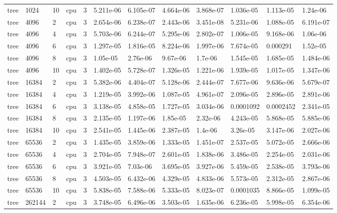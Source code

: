 \begin{tabular}{llllllllllll}
tree & 1024 & 10 & cpu & 3 & 5.211e-06 & 6.105e-07 & 4.664e-06 & 3.868e-07 & 1.036e-05 & 1.113e-05 & 1.24e-06 \\
tree & 4096 & 2 & cpu & 3 & 2.654e-06 & 6.238e-07 & 2.443e-06 & 3.451e-08 & 5.231e-06 & 1.088e-05 & 6.191e-07 \\
tree & 4096 & 4 & cpu & 3 & 5.703e-06 & 6.244e-07 & 5.295e-06 & 2.802e-07 & 1.006e-05 & 9.168e-06 & 1.06e-06 \\
tree & 4096 & 6 & cpu & 3 & 1.297e-05 & 1.816e-05 & 8.224e-06 & 1.997e-06 & 7.674e-05 & 0.000291 & 1.52e-05 \\
tree & 4096 & 8 & cpu & 3 & 1.05e-05 & 2.76e-06 & 9.67e-06 & 1.7e-06 & 1.545e-05 & 1.685e-05 & 1.484e-06 \\
tree & 4096 & 10 & cpu & 3 & 1.402e-05 & 5.728e-07 & 1.326e-05 & 1.221e-06 & 1.939e-05 & 1.017e-05 & 1.347e-06 \\
tree & 16384 & 2 & cpu & 3 & 5.382e-06 & 4.404e-07 & 5.128e-06 & 2.444e-07 & 7.677e-06 & 9.636e-06 & 5.679e-07 \\
tree & 16384 & 4 & cpu & 3 & 1.219e-05 & 3.992e-06 & 1.087e-05 & 4.961e-07 & 2.096e-05 & 2.896e-05 & 2.891e-06 \\
tree & 16384 & 6 & cpu & 3 & 3.138e-05 & 4.858e-05 & 1.727e-05 & 3.034e-06 & 0.0001092 & 0.0002452 & 2.341e-05 \\
tree & 16384 & 8 & cpu & 3 & 2.135e-05 & 1.197e-06 & 1.85e-05 & 2.32e-06 & 4.243e-05 & 5.868e-05 & 5.885e-06 \\
tree & 16384 & 10 & cpu & 3 & 2.541e-05 & 1.445e-06 & 2.387e-05 & 1.4e-06 & 3.26e-05 & 3.147e-06 & 2.027e-06 \\
tree & 65536 & 2 & cpu & 3 & 1.435e-05 & 3.859e-06 & 1.333e-05 & 1.451e-07 & 2.537e-05 & 5.072e-05 & 2.666e-06 \\
tree & 65536 & 4 & cpu & 3 & 2.704e-05 & 7.948e-07 & 2.601e-05 & 1.838e-06 & 3.486e-05 & 2.254e-05 & 2.031e-06 \\
tree & 65536 & 6 & cpu & 3 & 3.921e-05 & 7.03e-06 & 3.695e-05 & 3.927e-06 & 5.459e-05 & 2.538e-05 & 3.793e-06 \\
tree & 65536 & 8 & cpu & 3 & 4.503e-05 & 6.432e-06 & 4.329e-05 & 4.833e-06 & 5.573e-05 & 2.312e-05 & 2.867e-06 \\
tree & 65536 & 10 & cpu & 3 & 5.838e-05 & 7.588e-06 & 5.333e-05 & 8.023e-07 & 0.0001035 & 8.866e-05 & 1.099e-05 \\
tree & 262144 & 2 & cpu & 3 & 3.748e-05 & 6.496e-06 & 3.503e-05 & 1.635e-06 & 6.236e-05 & 5.998e-05 & 6.354e-06 \\

\end{tabular}
